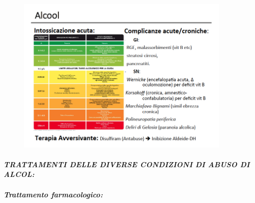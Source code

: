 \begin{figure}[!ht]
\centering
	\includegraphics[width=0.9\textwidth]{017/image19.png}
\end{figure}

\paragraph{\emph{TRATTAMENTI DELLE DIVERSE CONDIZIONI DI ABUSO DI ALCOL:}}

\subparagraph{\textbf{\emph{Trattamento farmacologico:}}}

